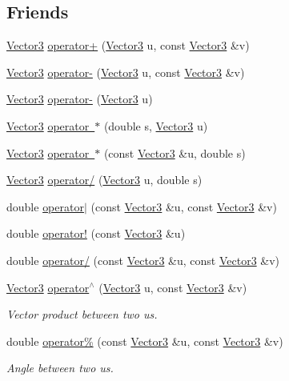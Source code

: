 \subsection*{Friends}
\begin{DoxyCompactItemize}
\item 
\mbox{\hyperlink{class_vector3}{Vector3}} \mbox{\hyperlink{class_vector3_a09b6fd43617473072319da125cc1ece8}{operator+}} (\mbox{\hyperlink{class_vector3}{Vector3}} u, const \mbox{\hyperlink{class_vector3}{Vector3}} \&v)
\item 
\mbox{\hyperlink{class_vector3}{Vector3}} \mbox{\hyperlink{class_vector3_ad504438b7c6757ab73c48013919f8333}{operator-\/}} (\mbox{\hyperlink{class_vector3}{Vector3}} u, const \mbox{\hyperlink{class_vector3}{Vector3}} \&v)
\item 
\mbox{\hyperlink{class_vector3}{Vector3}} \mbox{\hyperlink{class_vector3_a0e55d4adeebd39752a52dff8a1062bec}{operator-\/}} (\mbox{\hyperlink{class_vector3}{Vector3}} u)
\item 
\mbox{\hyperlink{class_vector3}{Vector3}} \mbox{\hyperlink{class_vector3_acfbed74a82515171cc077011a2512bbe}{operator $\ast$}} (double s, \mbox{\hyperlink{class_vector3}{Vector3}} u)
\item 
\mbox{\hyperlink{class_vector3}{Vector3}} \mbox{\hyperlink{class_vector3_a5b45d6f5e835014c7e2636791bf18da2}{operator $\ast$}} (const \mbox{\hyperlink{class_vector3}{Vector3}} \&u, double s)
\item 
\mbox{\hyperlink{class_vector3}{Vector3}} \mbox{\hyperlink{class_vector3_a9059e0264f23e1c78d195b095559cb79}{operator/}} (\mbox{\hyperlink{class_vector3}{Vector3}} u, double s)
\item 
double \mbox{\hyperlink{class_vector3_ac0d7df6bee7a105ace4ec138bff8a262}{operator$\vert$}} (const \mbox{\hyperlink{class_vector3}{Vector3}} \&u, const \mbox{\hyperlink{class_vector3}{Vector3}} \&v)
\item 
double \mbox{\hyperlink{class_vector3_ae2d5ffacf6098c4c2883e54131fa70c2}{operator!}} (const \mbox{\hyperlink{class_vector3}{Vector3}} \&u)
\item 
double \mbox{\hyperlink{class_vector3_a87668fe6d96f1826fb2721883d194ad3}{operator/}} (const \mbox{\hyperlink{class_vector3}{Vector3}} \&u, const \mbox{\hyperlink{class_vector3}{Vector3}} \&v)
\item 
\mbox{\hyperlink{class_vector3}{Vector3}} \mbox{\hyperlink{class_vector3_adb4922062355e087babc81e8d5b7c05f}{operator$^\wedge$}} (\mbox{\hyperlink{class_vector3}{Vector3}} u, const \mbox{\hyperlink{class_vector3}{Vector3}} \&v)
\begin{DoxyCompactList}\small\item\em Vector product between two us. \end{DoxyCompactList}\item 
double \mbox{\hyperlink{class_vector3_ab7427dc980f710e550fb4de32f0dfcbb}{operator\%}} (const \mbox{\hyperlink{class_vector3}{Vector3}} \&u, const \mbox{\hyperlink{class_vector3}{Vector3}} \&v)
\begin{DoxyCompactList}\small\item\em Angle between two us. \end{DoxyCompactList}\end{DoxyCompactItemize}

